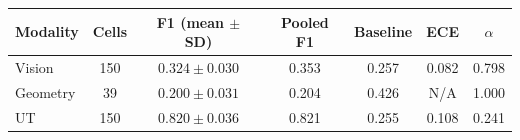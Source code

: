 \begin{tabular}{lcccccc}
\toprule
Modality & Cells & F1 (mean $\pm$ SD) & Pooled F1 & Baseline & ECE & $\alpha$ \\
\midrule
Vision & 150 & $0.324 \pm 0.030$ & 0.353 & 0.257 & 0.082 & 0.798 \\
Geometry & 39 & $0.200 \pm 0.031$ & 0.204 & 0.426 & N/A & 1.000 \\
UT & 150 & $0.820 \pm 0.036$ & 0.821 & 0.255 & 0.108 & 0.241 \\
\bottomrule
\end{tabular}